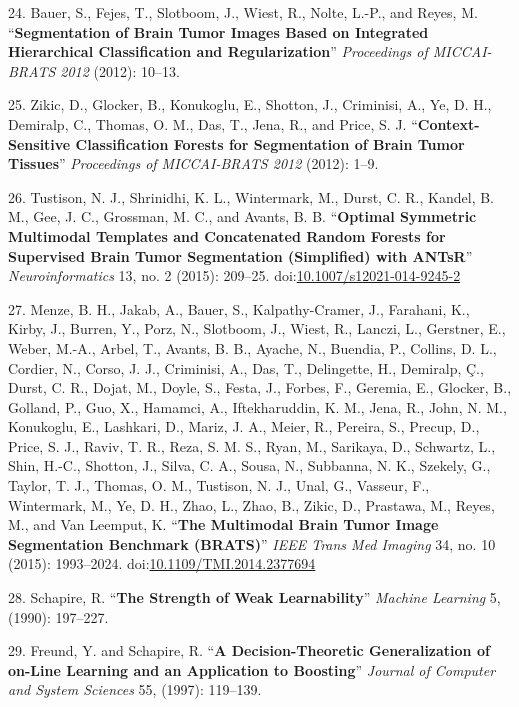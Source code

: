 \documentclass[11pt,]{article}
\begin{document}
\hypertarget{ref-bauer2012}{}
24. Bauer, S., Fejes, T., Slotboom, J., Wiest, R., Nolte, L.-P., and
Reyes, M. ``\textbf{Segmentation of Brain Tumor Images Based on
Integrated Hierarchical Classification and Regularization}''
\emph{Proceedings of MICCAI-BRATS 2012} (2012): 10--13.

\hypertarget{ref-zikic2012}{}
25. Zikic, D., Glocker, B., Konukoglu, E., Shotton, J., Criminisi, A.,
Ye, D. H., Demiralp, C., Thomas, O. M., Das, T., Jena, R., and Price, S.
J. ``\textbf{Context-Sensitive Classification Forests for Segmentation
of Brain Tumor Tissues}'' \emph{Proceedings of MICCAI-BRATS 2012}
(2012): 1--9.

\hypertarget{ref-Tustison:2015aa}{}
26. Tustison, N. J., Shrinidhi, K. L., Wintermark, M., Durst, C. R.,
Kandel, B. M., Gee, J. C., Grossman, M. C., and Avants, B. B.
``\textbf{Optimal Symmetric Multimodal Templates and Concatenated Random
Forests for Supervised Brain Tumor Segmentation (Simplified) with
ANTsR}'' \emph{Neuroinformatics} 13, no. 2 (2015): 209--25.
doi:\href{https://doi.org/10.1007/s12021-014-9245-2}{10.1007/s12021-014-9245-2}

\hypertarget{ref-Menze:2015aa}{}
27. Menze, B. H., Jakab, A., Bauer, S., Kalpathy-Cramer, J., Farahani,
K., Kirby, J., Burren, Y., Porz, N., Slotboom, J., Wiest, R., Lanczi,
L., Gerstner, E., Weber, M.-A., Arbel, T., Avants, B. B., Ayache, N.,
Buendia, P., Collins, D. L., Cordier, N., Corso, J. J., Criminisi, A.,
Das, T., Delingette, H., Demiralp, Ç., Durst, C. R., Dojat, M., Doyle,
S., Festa, J., Forbes, F., Geremia, E., Glocker, B., Golland, P., Guo,
X., Hamamci, A., Iftekharuddin, K. M., Jena, R., John, N. M., Konukoglu,
E., Lashkari, D., Mariz, J. A., Meier, R., Pereira, S., Precup, D.,
Price, S. J., Raviv, T. R., Reza, S. M. S., Ryan, M., Sarikaya, D.,
Schwartz, L., Shin, H.-C., Shotton, J., Silva, C. A., Sousa, N.,
Subbanna, N. K., Szekely, G., Taylor, T. J., Thomas, O. M., Tustison, N.
J., Unal, G., Vasseur, F., Wintermark, M., Ye, D. H., Zhao, L., Zhao,
B., Zikic, D., Prastawa, M., Reyes, M., and Van Leemput, K.
``\textbf{The Multimodal Brain Tumor Image Segmentation Benchmark
(BRATS)}'' \emph{IEEE Trans Med Imaging} 34, no. 10 (2015): 1993--2024.
doi:\href{https://doi.org/10.1109/TMI.2014.2377694}{10.1109/TMI.2014.2377694}

\hypertarget{ref-schapire1990}{}
28. Schapire, R. ``\textbf{The Strength of Weak Learnability}''
\emph{Machine Learning} 5, (1990): 197--227.

\hypertarget{ref-freund1997}{}
29. Freund, Y. and Schapire, R. ``\textbf{A Decision-Theoretic
Generalization of on-Line Learning and an Application to Boosting}''
\emph{Journal of Computer and System Sciences} 55, (1997): 119--139.
\end{document}
